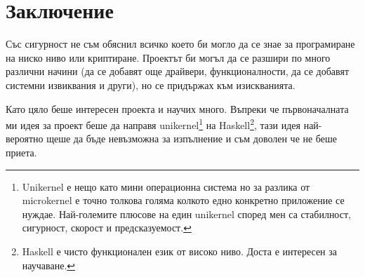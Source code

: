 \section*{Заключение}
Със сигурност не съм обяснил всичко което би могло да се знае за програмиране на ниско ниво или криптиране. Проектът би могъл да се разшири по много различни начини (да се добавят още драйвери, функционалности, да се добавят системни извиквания и други), но се придържах към изискванията.

Като цяло беше интересен проекта и научих много. Въпреки че първоначалната ми идея за проект беше да направя unikernel\footnote{Unikernel е нещо като мини операционна система но за разлика от microkernel е точно толкова голяма колкото едно конкретно приложение се нуждае. Най-големите плюсове на един unikernel според мен са стабилност, сигурност, скорост и предсказуемост.} на Haskell\footnote{Haskell е чисто функционален език от високо ниво. Доста е интересен за научаване.}, тази идея най-вероятно щеше да бъде невъзможна за изпълнение и съм доволен че не беше приета.


